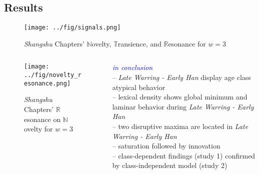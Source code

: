 \subsection{Results}
\begin{frame}
\begin{figure}
	\centering
	\texttt{[image: ../fig/signals.png]}
	\caption{\emph{Shangshu} Chapters' $\mathbb{N}$ovelty, $\mathbb{T}$ransience, and $\mathbb{R}$esonance for $w = 3$}
\end{figure}
\begin{columns}
	\begin{column}{.5\textwidth}
		\begin{figure}
			\centering
			\texttt{[image: ../fig/novelty\_resonance.png]}
			\caption{\emph{Shangshu} Chapters' $\mathbb{R}$esonance on $\mathbb{N}$ovelty for $w = 3$}
		\end{figure}
	\end{column}
	\begin{column}{.5\textwidth}
		\textcolor{blue}{\emph{in conclusion}}\\
		-- \emph{Late Warring - Early Han} display age class atypical behavior \\
		-- lexical density shows global minimum and laminar behavior during \emph{Late Warring - Early Han}\\ 
		-- two disruptive maxima are located in \emph{Late Warring - Early Han}\\
		\medskip
		-- saturation followed by innovation\\
		-- class-dependent findings (study 1) confirmed by class-independent model (study 2)\\
	\end{column}
\end{columns}
\end{frame}